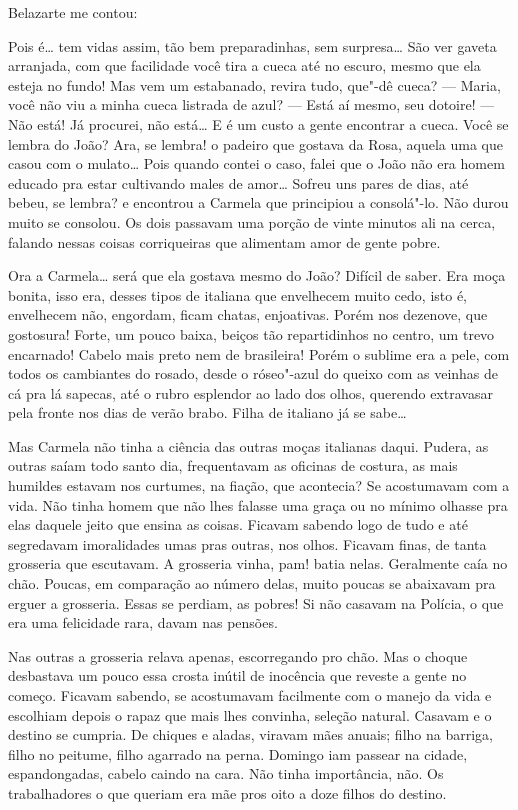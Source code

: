\begin{linenumbers}
Belazarte me contou:

Pois é\ldots{} tem vidas assim, tão bem preparadinhas, sem surpresa\ldots{} São
ver gaveta arranjada, com que facilidade você tira a cueca até no
escuro, mesmo que ela esteja no fundo! Mas vem um estabanado, revira
tudo, que"-dê cueca? --- Maria, você não viu a minha cueca listrada de
azul? --- Está aí mesmo, seu dotoire! --- Não está! Já procurei, não
está\ldots{} E é um custo a gente encontrar a cueca. Você se lembra do João?
Ara, se lembra! o padeiro que gostava da Rosa, aquela uma que casou com
o mulato\ldots{} Pois quando contei o caso, falei que o João não era homem
educado pra estar cultivando males de amor\ldots{} Sofreu uns pares de dias,
até bebeu, se lembra? e encontrou a Carmela que principiou a consolá"-lo.
Não durou muito se consolou. Os dois passavam uma porção de vinte
minutos ali na cerca, falando nessas coisas corriqueiras que alimentam
amor de gente pobre.

Ora a Carmela\ldots{} será que ela gostava mesmo do João? Difícil de saber.
Era moça bonita, isso era, desses tipos de italiana que envelhecem muito
cedo, isto é, envelhecem não, engordam, ficam chatas, enjoativas. Porém
nos dezenove, que gostosura! Forte, um pouco baixa, beiços tão
repartidinhos no centro, um trevo encarnado! Cabelo mais preto nem de
brasileira! Porém o sublime era a pele, com todos os cambiantes do
rosado, desde o róseo"-azul do queixo com as veinhas de cá pra lá
sapecas, até o rubro esplendor ao lado dos olhos, querendo extravasar
pela fronte nos dias de verão brabo. Filha de italiano já se sabe\ldots{}

Mas Carmela não tinha a ciência das outras moças italianas daqui.
Pudera, as outras saíam todo santo dia, frequentavam as oficinas de
costura, as mais humildes estavam nos curtumes, na fiação, que
acontecia? Se acostumavam com a vida. Não tinha homem que não lhes
falasse uma graça ou no mínimo olhasse pra elas daquele jeito que ensina
as coisas. Ficavam sabendo logo de tudo e até segredavam imoralidades
umas pras outras, nos olhos. Ficavam finas, de tanta grosseria que
escutavam. A grosseria vinha, pam! batia nelas. Geralmente caía no chão.
Poucas, em comparação ao número delas, muito poucas se abaixavam pra
erguer a grosseria. Essas se perdiam, as pobres! Si não casavam na
Polícia, o que era uma felicidade rara, davam nas pensões.

Nas outras a grosseria relava apenas, escorregando pro chão. Mas o
choque desbastava um pouco essa crosta inútil de inocência que reveste a
gente no começo. Ficavam sabendo, se acostumavam facilmente com o manejo
da vida e escolhiam depois o rapaz que mais lhes convinha, seleção
natural. Casavam e o destino se cumpria. De chiques e aladas, viravam
mães anuais; filho na barriga, filho no peitume, filho agarrado na
perna. Domingo iam passear na cidade, espandongadas, cabelo caindo na
cara. Não tinha importância, não. Os trabalhadores o que queriam era mãe
pros oito a doze filhos do destino.


\end{linenumbers}
